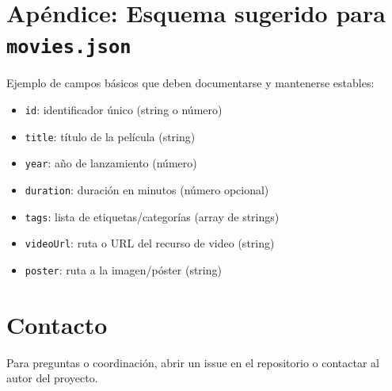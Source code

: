 \documentclass[11pt,a4paper]{article}
\begin{document}
\section{Apéndice: Esquema sugerido para \texttt{movies.json}}
Ejemplo de campos básicos que deben documentarse y mantenerse estables:
\begin{itemize}
  \item \texttt{id}: identificador único (string o número)
  \item \texttt{title}: título de la película (string)
  \item \texttt{year}: año de lanzamiento (número)
  \item \texttt{duration}: duración en minutos (número opcional)
  \item \texttt{tags}: lista de etiquetas/categorías (array de strings)
  \item \texttt{videoUrl}: ruta o URL del recurso de video (string)
  \item \texttt{poster}: ruta a la imagen/póster (string)
\end{itemize}

\section{Contacto}
Para preguntas o coordinación, abrir un issue en el repositorio o contactar al autor del proyecto.
\end{document}
